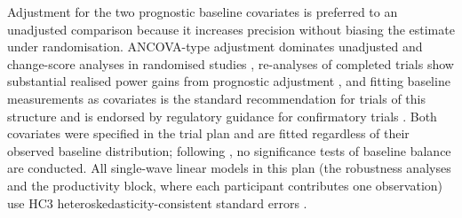 Adjustment for the two prognostic baseline covariates is preferred to an unadjusted comparison because it increases precision without biasing the estimate under randomisation. ANCOVA-type adjustment dominates unadjusted and change-score analyses in randomised studies \parencite{vanbreukelen2006}, %
re-analyses of completed trials show substantial realised power gains from prognostic adjustment \parencite{kahan2014}, %
and fitting baseline measurements as covariates is the standard recommendation for trials of this structure \parencite{vickers2001} %
and is endorsed by regulatory guidance for confirmatory trials \parencite{ema2015,fda2023}.
Both covariates were specified in the trial plan and are fitted regardless of their observed baseline distribution; following \textcite{senn1994}, %
no significance tests of baseline balance are conducted. All single-wave linear models in this plan (the robustness analyses and the productivity block, where each participant contributes one observation) use HC3 heteroskedasticity-consistent standard errors \parencite{long2000}. %

